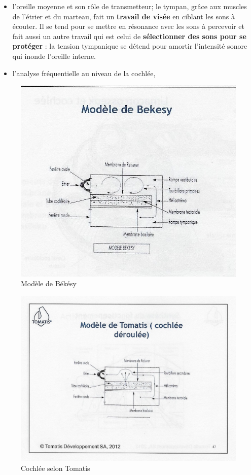 \begin{itemize}
	\item l'oreille moyenne et son rôle de transmetteur; le tympan, grâce aux muscles de l'étrier et du marteau, 
fait
		un\textbf{ travail de visée} en ciblant les sons à
                écouter. Il 
se tend
		pour se mettre en résonance avec les sons à percevoir
                et fait aussi un autre travail qui est celui de \textbf{sélectionner des 
sons
		pour se protéger} : la tension tympanique se détend pour amortir 
l'intensité
		sonore qui inonde l'oreille interne. 

	\item l'analyse fréquentielle au niveau de la cochlée, 
\end{itemize}








\begin{figure}
	\centering
	\includegraphics[width=0.7\linewidth]{images/Cochleederoule_bas.jpg}
	\caption[Modèle de Békésy]{Modèle de Békésy}
	\label{fig:cochleederoulebas}
\end{figure}


 \begin{figure}
	\centering
	\includegraphics[width=0.7\linewidth]{images/Cochleederoule_haut.jpg}
	\caption[Cochlée selon Tomatis]{Cochlée selon Tomatis}
	\label{fig:cochleederoulehaut}
      \end{figure}

